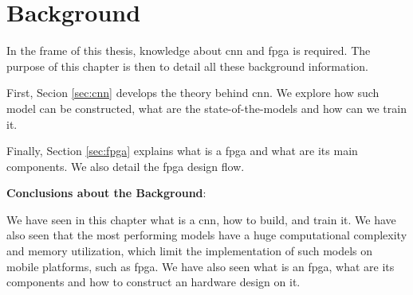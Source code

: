 \chapter{Background} \label{chap:background}
In the frame of this thesis, knowledge about \acrshort{cnn} and \acrshort{fpga} is required. The purpose of this chapter is then to detail all these background information.

First, Secion \ref{sec:cnn} develops the theory behind \acrshort{cnn}. We explore how such model can be constructed, what are the state-of-the-models and how can we train it.

Finally, Section \ref{sec:fpga} explains what is a \acrshort{fpga} and what are its main components. We also detail the \acrshort{fpga} design flow.


%
\begin{tcolorbox}
    \textbf{Conclusions about the Background}:

    We have seen in this chapter what is a \acrshort{cnn}, how to build, and train it. We have also seen that the most performing models have a huge computational complexity and memory utilization, which limit the implementation of such models on mobile platforms, such as \acrshort{fpga}. We have also seen what is an \acrshort{fpga}, what are its components and how to construct an hardware design on it.
\end{tcolorbox}
% 
\afterpage{\blankpage}
\cleardoublepage
\newpage
